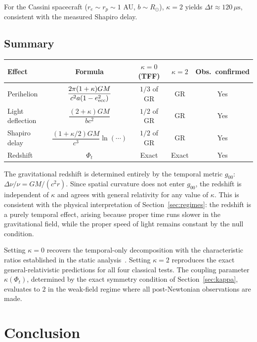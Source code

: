 \documentclass[12pt]{article}
\begin{document}
For the Cassini spacecraft ($r_e \sim r_p \sim 1$ AU, $b \sim R_\odot$), $\kappa = 2$ yields $\Delta t \approx 120\,\mu\text{s}$, consistent with the measured Shapiro delay.

\subsection{Summary}
\label{sec:pn_summary}

\begin{center}
\small
\begin{tabular}{lcccc}
\hline
Effect & Formula & $\kappa=0$ (TFF) & $\kappa=2$ & Obs.\ confirmed \\
\hline
Perihelion & $\dfrac{2\pi(1+\kappa)GM}{c^2 a(1-e_{\rm ecc}^2)}$ & $1/3$ of GR & GR & Yes \\[8pt]
Light deflection & $\dfrac{(2+\kappa)GM}{bc^2}$ & $1/2$ of GR & GR & Yes \\[8pt]
Shapiro delay & $\dfrac{(1+\kappa/2)GM}{c^3}\ln(\cdots)$ & $1/2$ of GR & GR & Yes \\[8pt]
Redshift & $\Phi_t$ & Exact & Exact & Yes \\
\hline
\end{tabular}
\end{center}

The gravitational redshift is determined entirely by the temporal metric $g_{00}$: $\Delta\nu/\nu = GM/(c^2 r)$. Since spatial curvature does not enter $g_{00}$, the redshift is independent of $\kappa$ and agrees with general relativity for any value of $\kappa$. This is consistent with the physical interpretation of Section~\ref{sec:regimes}: the redshift is a purely temporal effect, arising because proper time runs slower in the gravitational field, while the proper speed of light remains constant by the null condition.

Setting $\kappa = 0$ recovers the temporal-only decomposition with the characteristic ratios established in the static analysis~\cite{Gwak2026a}. Setting $\kappa = 2$ reproduces the exact general-relativistic predictions for all four classical tests. The coupling parameter $\kappa(\Phi_t)$, determined by the exact symmetry condition of Section~\ref{sec:kappa}, evaluates to $2$ in the weak-field regime where all post-Newtonian observations are made.


\section{Conclusion}
\label{sec:conclusion}
\end{document}

